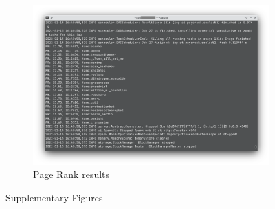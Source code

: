 \begin{figure}[ht]
     \begin{subfigure}[b]{0.48\textwidth}
         \centering
    \includegraphics[width=\textwidth]{figure/PR-result.png}
    \caption{Page Rank results}
    \label{fig:PR-result}
     \end{subfigure}
     
        \caption{Supplementary Figures}
        \label{fig:supp}
\end{figure}
